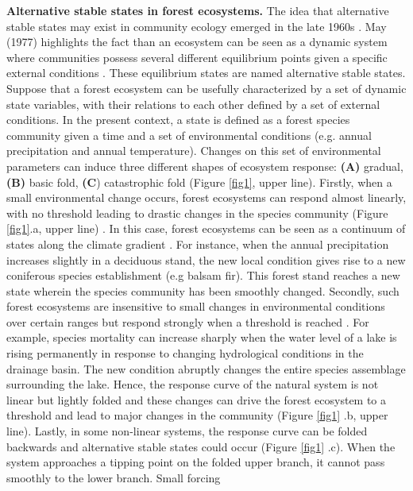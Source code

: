 \textbf{Alternative stable states in forest ecosystems.} The idea that
alternative stable states may exist in community ecology emerged
in the late 1960s \cite{Scheffer2001,Society2014a}. May (1977) highlights
the fact than an ecosystem can be seen as a dynamic system where
communities possess several different equilibrium points given a specific
external conditions \cite{May1977}. These equilibrium states are named
alternative stable states. Suppose that a forest ecosystem can be usefully
characterized by a set of dynamic state variables, with their relations to
each other defined by a set of external conditions. In the present context, a
state is defined as a forest species community given a time and a set of
environmental conditions (e.g. annual precipitation and annual temperature).
Changes on this set of environmental parameters can induce three different
shapes of ecosystem response: \textbf{(A)} gradual, \textbf{(B)} basic fold,
\textbf{(C}) catastrophic fold  \cite{Scheffer2001} (Figure \ref{fig1}, upper
line). Firstly, when a small environmental change occurs, forest ecosystems can
respond almost linearly, with no threshold leading to drastic changes in the
species community (Figure \ref{fig1}.a, upper line)
\cite{Scheffer2001,Scheffer2009}. In this case, forest ecosystems can be seen
as a continuum of states along the climate gradient
\cite{Scheffer2001,Scheffer2009,scheffer2009critical}. For instance, when the
annual precipitation increases slightly in a deciduous stand, the new
local condition gives rise to a new coniferous species establishment (e.g
balsam fir). This forest stand reaches a new state wherein the species
community has been smoothly changed. Secondly, such forest ecosystems are
insensitive to small changes in environmental conditions over certain ranges
but respond strongly when a threshold is reached \cite{scheffer2009critical}.
For example, species mortality can increase sharply when the water level of a
lake is rising permanently in response to changing hydrological conditions in
the drainage basin. The new condition abruptly changes the entire
species assemblage surrounding the lake. Hence, the response curve of the
natural system is not linear but lightly folded and these changes can drive
the forest ecosystem to a threshold and lead to major changes in the community
(Figure \ref{fig1} .b, upper line). Lastly, in some non-linear systems, the
response curve can be folded backwards and alternative stable states could
occur (Figure \ref{fig1} .c). When the system approaches a tipping point on the
folded upper branch, it cannot pass smoothly to the lower branch. Small forcing
